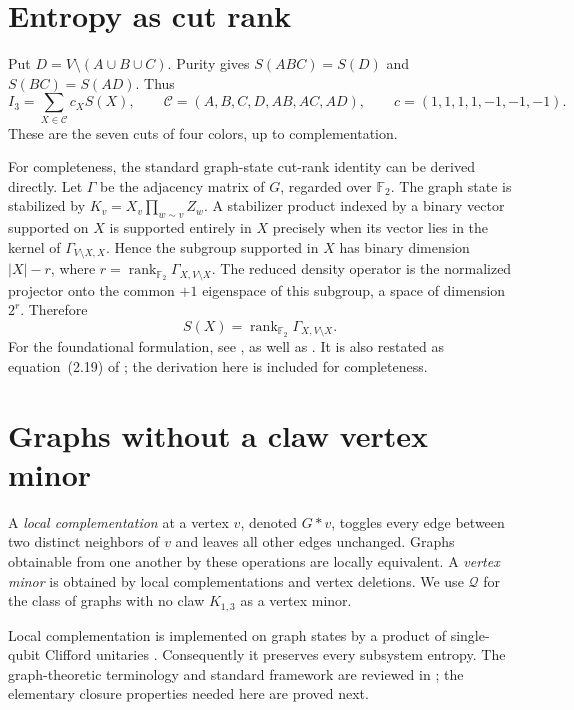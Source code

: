 \documentclass[11pt,letterpaper]{article}
\newcommand{\F}{\mathbb F_2}
\newcommand{\rank}{\operatorname{rank}}
\newcommand{\Ithree}{I_3}
\begin{document}
\section{Entropy as cut rank}
Put $D=V\setminus(A\cup B\cup C)$. Purity gives $S(ABC)=S(D)$ and $S(BC)=S(AD)$. Thus
\begin{equation}\label{eq:seven}
 \Ithree=\sum_{X\in\mathcal C}c_X S(X),\qquad
 \mathcal C=(A,B,C,D,AB,AC,AD),\qquad c=(1,1,1,1,-1,-1,-1).
\end{equation}
These are the seven cuts of four colors, up to complementation.

For completeness, the standard graph-state cut-rank identity can be derived directly. Let $\Gamma$ be the adjacency matrix of $G$, regarded over $\F$. The graph state is stabilized by $K_v=X_v\prod_{w\sim v}Z_w$. A stabilizer product indexed by a binary vector supported on $X$ is supported entirely in $X$ precisely when its vector lies in the kernel of $\Gamma_{V\setminus X,X}$. Hence the subgroup supported in $X$ has binary dimension $|X|-r$, where $r=\rank_{\F}\Gamma_{X,V\setminus X}$. The reduced density operator is the normalized projector onto the common $+1$ eigenspace of this subgroup, a space of dimension $2^r$. Therefore
\begin{equation}\label{eq:rank}
 S(X)=\rank_{\F}\Gamma_{X,V\setminus X}.
\end{equation}
For the foundational formulation, see \cite[Proposition~10, equation~(132), and the flat-spectrum discussion leading to equation~(161)]{Hein2006}, as well as \cite{Hein2004}. It is also restated as equation~(2.19) of \cite{FKMP}; the derivation here is included for completeness.

\section{Graphs without a claw vertex minor}\label{sec:classification}
A \emph{local complementation} at a vertex $v$, denoted $G*v$, toggles every edge between two distinct neighbors of $v$ and leaves all other edges unchanged. Graphs obtainable from one another by these operations are locally equivalent. A \emph{vertex minor} is obtained by local complementations and vertex deletions. We use $\mathcal Q$ for the class of graphs with no claw $K_{1,3}$ as a vertex minor.

Local complementation is implemented on graph states by a product of single-qubit Clifford unitaries \cite{Hein2006}. Consequently it preserves every subsystem entropy. The graph-theoretic terminology and standard framework are reviewed in \cite{KimOum}; the elementary closure properties needed here are proved next.
\end{document}
